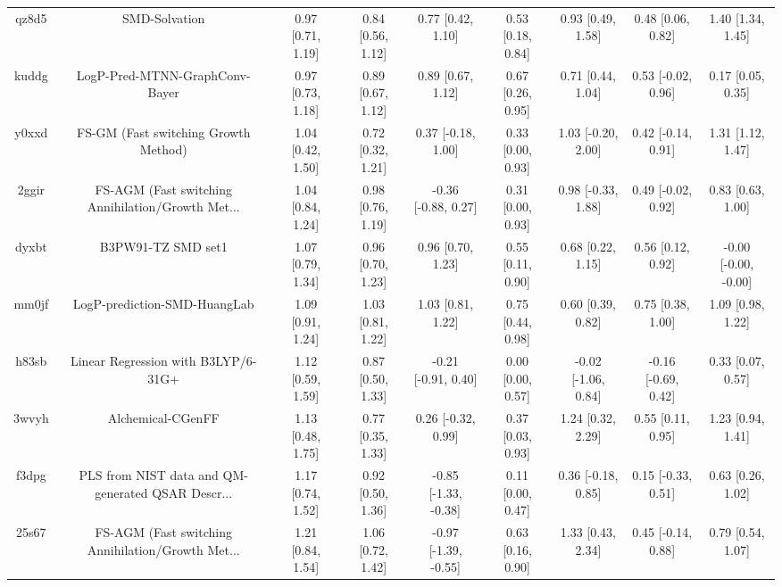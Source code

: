 \documentclass{article}
\begin{document}
\begin{center}
\begin{longtable}{|ccccccccc|}
 qz8d5 &                                      SMD-Solvation &  0.97 [0.71, 1.19] &  0.84 [0.56, 1.12] &     0.77 [0.42, 1.10] &  0.53 [0.18, 0.84] &    0.93 [0.49, 1.58] &    0.48 [0.06, 0.82] &     1.40 [1.34, 1.45] \\
 kuddg &                     LogP-Pred-MTNN-GraphConv-Bayer &  0.97 [0.73, 1.18] &  0.89 [0.67, 1.12] &     0.89 [0.67, 1.12] &  0.67 [0.26, 0.95] &    0.71 [0.44, 1.04] &   0.53 [-0.02, 0.96] &     0.17 [0.05, 0.35] \\
 y0xxd &               FS-GM (Fast switching Growth Method) &  1.04 [0.42, 1.50] &  0.72 [0.32, 1.21] &    0.37 [-0.18, 1.00] &  0.33 [0.00, 0.93] &   1.03 [-0.20, 2.00] &   0.42 [-0.14, 0.91] &     1.31 [1.12, 1.47] \\
 2ggir &  FS-AGM (Fast switching Annihilation/Growth Met... &  1.04 [0.84, 1.24] &  0.98 [0.76, 1.19] &   -0.36 [-0.88, 0.27] &  0.31 [0.00, 0.93] &   0.98 [-0.33, 1.88] &   0.49 [-0.02, 0.92] &     0.83 [0.63, 1.00] \\
 dyxbt &                                 B3PW91-TZ SMD set1 &  1.07 [0.79, 1.34] &  0.96 [0.70, 1.23] &     0.96 [0.70, 1.23] &  0.55 [0.11, 0.90] &    0.68 [0.22, 1.15] &    0.56 [0.12, 0.92] &  -0.00 [-0.00, -0.00] \\
 mm0jf &                       LogP-prediction-SMD-HuangLab &  1.09 [0.91, 1.24] &  1.03 [0.81, 1.22] &     1.03 [0.81, 1.22] &  0.75 [0.44, 0.98] &    0.60 [0.39, 0.82] &    0.75 [0.38, 1.00] &     1.09 [0.98, 1.22] \\
 h83sb &                Linear Regression with B3LYP/6-31G+ &  1.12 [0.59, 1.59] &  0.87 [0.50, 1.33] &   -0.21 [-0.91, 0.40] &  0.00 [0.00, 0.57] &  -0.02 [-1.06, 0.84] &  -0.16 [-0.69, 0.42] &     0.33 [0.07, 0.57] \\
 3wvyh &                                  Alchemical-CGenFF &  1.13 [0.48, 1.75] &  0.77 [0.35, 1.33] &    0.26 [-0.32, 0.99] &  0.37 [0.03, 0.93] &    1.24 [0.32, 2.29] &    0.55 [0.11, 0.95] &     1.23 [0.94, 1.41] \\
 f3dpg &  PLS from NIST data and QM-generated QSAR Descr... &  1.17 [0.74, 1.52] &  0.92 [0.50, 1.36] &  -0.85 [-1.33, -0.38] &  0.11 [0.00, 0.47] &   0.36 [-0.18, 0.85] &   0.15 [-0.33, 0.51] &     0.63 [0.26, 1.02] \\
 25s67 &  FS-AGM (Fast switching Annihilation/Growth Met... &  1.21 [0.84, 1.54] &  1.06 [0.72, 1.42] &  -0.97 [-1.39, -0.55] &  0.63 [0.16, 0.90] &    1.33 [0.43, 2.34] &   0.45 [-0.14, 0.88] &     0.79 [0.54, 1.07] \\

\end{longtable}
\end{center}
\end{document}
